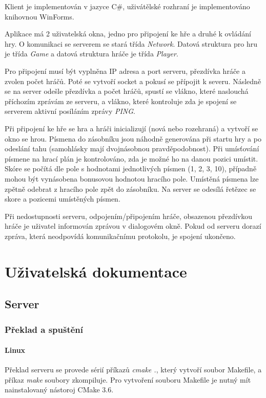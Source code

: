 Klient je implementován v jazyce C\#, uživátělské rozhraní je implementováno knihovnou WinForms.

Aplikace má 2 uživatelská okna, jedno pro připojení ke hře a druhé k ovládání hry. O komunikaci se serverem se stará třída \emph{Network}. Datová struktura pro hru je třída \emph{Game} a datová struktura hráče je třída \emph{Player}.

Pro připojení musí být vyplněna IP adresa a port serveru, přezdívka hráče a zvolen počet hráčů. Poté se vytvoří socket a pokusí se přípojit k severu. Následně se na server odešle přezdívka a počet hráčů, spustí se vlákno, které naslouchá příchozím zprávám ze serveru, a vlákno, které kontroluje zda je spojení se serverem aktivní posíláním zprávy \emph{PING}.

Při připojení ke hře se hra a hráči inicializují (nová nebo rozehraná) a vytvoří se okno se hrou. Písmena do zásobníku jsou náhodně generována při startu hry a po odeslání tahu (samohlásky mají dvojnásobnou pravděpodobnost). Při umísťování písmene na hrací plán je kontrolováno, zda je možné ho na danou pozici umístit. Skóre se počítá dle pole s hodnotami jednotlivých písmen (1, 2, 3, 10), případně mohou být vynásobena bonusovou hodnotou hracího pole. Umístěná písmena lze zpětně odebrat z hracího pole zpět do zásobníku. Na server se odesílá řetězec se skore a pozicemi umístěných písmen.

Při nedostupnosti serveru, odpojením/připojením hráče, obsazenou přezdívkou hráče je uživatel informován zprávou v dialogovém okně. Pokud od serveru dorazí zpráva, která neodpovídá komunikačnímu protokolu, je spojení ukončeno.



\chapter{Uživatelská dokumentace}

\section{Server}
\subsection{Překlad a spuštění}
\subsubsection{Linux}
Překlad serveru se provede sérií příkazů \emph{cmake .}, který vytvoří soubor Makefile, a příkaz \emph{make} soubory zkompiluje. Pro vytvoření souboru Makefile je nutný mít nainstalovaný nástoroj CMake 3.6.

